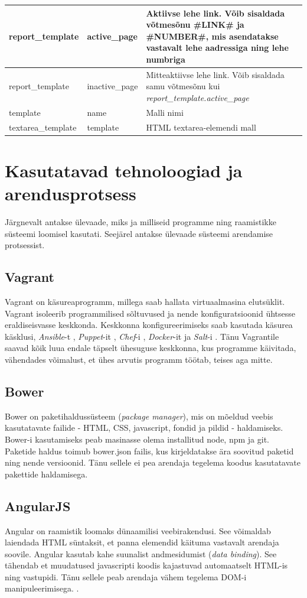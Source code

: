\documentclass[a4paper,12pt]{article} %
\begin{document}
\begin{table}[H]
\begin{tabular}{|p{3cm}|p{3cm}|p{9cm}|}
report\_template & active\_page & Aktiivse lehe link. Võib sisaldada võtmesõnu \#LINK\# ja \#NUMBER\#, mis asendatakse vastavalt lehe aadressiga ning lehe numbriga \\ \hline
report\_template & inactive\_page & Mitteaktiivse lehe link. Võib sisaldada samu võtmesõnu kui \textit{report\_template.active\_page} \\ \hline
template & name & Malli nimi \\ \hline
textarea\_template & template & HTML textarea-elemendi mall \\ \hline
\end{tabular}
\end{table}

\section{Kasutatavad tehnoloogiad ja arendusprotsess}
Järgnevalt antakse ülevaade, miks ja milliseid programme ning raamistikke süsteemi loomisel kasutati. Seejärel antakse ülevaade süsteemi arendamise protsessist.
\subsection{Vagrant}
Vagrant on käsureaprogramm, millega saab hallata virtuaalmasina elutsüklit. Vagrant isoleerib programmilised sõltuvused ja nende konfiguratsioonid ühtsesse eraldiseisvasse keskkonda. Keskkonna konfigureerimiseks saab kasutada käsurea käsklusi, \textit{Ansible}-t \cite{Ansible}, \textit{Puppet}-it \cite{Puppet}, \textit{Chef}-i \cite{Chef}, \textit{Docker}-it \cite{Docker} ja \textit{Salt}-i \cite{Salt}. Tänu Vagrantile saavad kõik luua endale täpselt ühesuguse keskkonna, kus programme käivitada, vähendades võimalust, et ühes arvutis programm töötab, teises aga mitte. \cite{Why_Vagrant}
\subsection{Bower}
Bower on paketihaldussüsteem (\textit{package manager}), mis on mõeldud veebis kasutatavate failide - HTML, CSS, javascript, fondid ja pildid - haldamiseks. Bower-i kasutamiseks peab masinasse olema installitud node, npm ja git. Paketide haldus toimub bower.json failis, kus kirjeldatakse ära soovitud paketid ning nende versioonid. Tänu sellele ei pea arendaja tegelema koodus kasutatavate pakettide haldamisega. \cite{Bower}
\subsection{AngularJS}
Angular on raamistik loomaks dünaamilisi veebirakendusi. See võimaldab laiendada HTML süntaksit, et panna elemendid käituma vastavalt arendaja soovile. Angular kasutab kahe suunalist andmesidumist (\textit{data binding}). See tähendab et muudatused javascripti koodis kajastuvad automaatselt HTML-is ning vastupidi. Tänu sellele peab arendaja vähem tegelema DOM-i manipuleerimisega.  \cite{AngularJS}.
\end{document}
